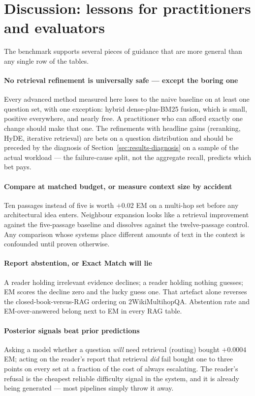 \section{Discussion: lessons for practitioners and evaluators}
\label{sec:discussion}

The benchmark supports several pieces of guidance that are more general
than any single row of the tables.

\paragraph{No retrieval refinement is universally safe --- except the
boring one} Every advanced method measured here loses to the naive
baseline on at least one question set, with one exception: hybrid
dense-plus-BM25 fusion, which is small, positive everywhere, and nearly
free. A practitioner who can afford exactly one change should make that
one. The refinements with headline gains (reranking, HyDE, iterative
retrieval) are bets on a question distribution and should be preceded by
the diagnosis of Section~\ref{sec:results-diagnosis} on a sample of the
actual workload --- the failure-cause split, not the aggregate recall,
predicts which bet pays.

\paragraph{Compare at matched budget, or measure context size by
accident} Ten passages instead of five is worth $+0.02$ EM on a multi-hop
set before any architectural idea enters. Neighbour expansion looks like a
retrieval improvement against the five-passage baseline and dissolves
against the twelve-passage control. Any comparison whose systems place
different amounts of text in the context is confounded until proven
otherwise.

\paragraph{Report abstention, or Exact Match will lie} A reader holding
irrelevant evidence declines; a reader holding nothing guesses; EM scores
the decline zero and the lucky guess one. That artefact alone reverses the
closed-book-versus-RAG ordering on 2WikiMultihopQA. Abstention rate and
EM-over-answered belong next to EM in every RAG table.

\paragraph{Posterior signals beat prior predictions} Asking a model
whether a question \emph{will} need retrieval (routing) bought $+0.0004$
EM; acting on the reader's report that retrieval \emph{did} fail bought
one to three points on every set at a fraction of the cost of always
escalating. The reader's refusal is the cheapest reliable difficulty
signal in the system, and it is already being generated --- most
pipelines simply throw it away.


